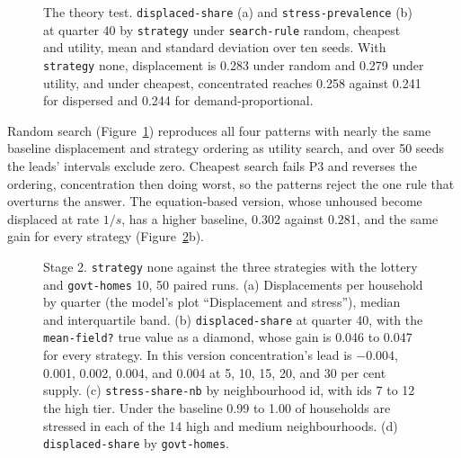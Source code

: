 \documentclass[10pt,a4paper]{article}
\begin{document}
\begin{figure}[t]
\centering
{}
\caption{The theory test. \texttt{displaced-share} (a) and \texttt{stress-prevalence} (b) at quarter 40 by \texttt{strategy} under \texttt{search-rule} random, cheapest and utility, mean and standard deviation over ten seeds. With \texttt{strategy} none, displacement is 0.283 under random and 0.279 under utility, and under cheapest, concentrated reaches 0.258 against 0.241 for dispersed and 0.244 for demand-proportional.}
\label{fig:theory}
\end{figure}

Random search (Figure~\ref{fig:theory}) reproduces all four patterns with nearly the same baseline displacement and strategy ordering as utility search, and over 50 seeds the leads' intervals exclude zero. Cheapest search fails P3 and reverses the ordering, concentration then doing worst, so the patterns reject the one rule that overturns the answer. The equation-based version, whose unhoused become displaced at rate $1/s$, has a higher baseline, 0.302 against 0.281, and the same gain for every strategy (Figure~\ref{fig:pooled}b).

\begin{figure}[t]
\centering
{}
\caption{Stage 2. \texttt{strategy} none against the three strategies with the lottery and \texttt{govt-homes} 10, 50 paired runs. (a) Displacements per household by quarter (the model's plot ``Displacement and stress''), median and interquartile band. (b) \texttt{displaced-share} at quarter 40, with the \texttt{mean-field?} true value as a diamond, whose gain is 0.046 to 0.047 for every strategy. In this version concentration's lead is $-0.004$, 0.001, 0.002, 0.004, and 0.004 at 5, 10, 15, 20, and 30 per cent supply. (c) \texttt{stress-share-nb} by neighbourhood id, with ids 7 to 12 the high tier. Under the baseline 0.99 to 1.00 of households are stressed in each of the 14 high and medium neighbourhoods. (d) \texttt{displaced-share} by \texttt{govt-homes}.}
\label{fig:pooled}
\end{figure}
\end{document}
